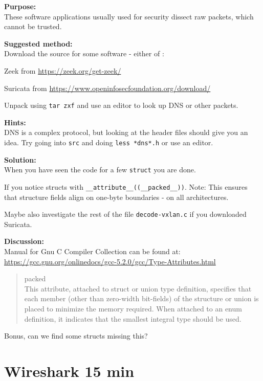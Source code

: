 \documentclass[a4paper,11pt,notitlepage]{report}
\begin{document}
{\bf Purpose:}\\
These software applications usually used for security dissect raw packets, which cannot be trusted.

{\bf Suggested method:}\\
Download the source for some software - either of :
\begin{list2}
\item Zeek from \url{https://zeek.org/get-zeek/}
\item Suricata from \url{https://www.openinfosecfoundation.org/download/}
\end{list2}

Unpack using \verb+tar zxf+ and use an editor to look up DNS or other packets.

{\bf Hints:}\\
DNS is a complex protocol, but looking at the header files should give you an idea. Try going into \verb+src+ and doing \verb+less *dns*.h+ or use an editor.


{\bf Solution:}\\
When you have seen the code for a few \verb+struct+ you are done.

If you notice structs with \verb+__attribute__((__packed__))+. Note: This ensures that structure fields align on one-byte boundaries - on all architectures.

Maybe also investigate the rest of the file \verb+decode-vxlan.c+ if you downloaded Suricata.

{\bf Discussion:}\\
Manual for Gnu C Compiler Collection can be found at:\\
\url{https://gcc.gnu.org/onlinedocs/gcc-5.2.0/gcc/Type-Attributes.html}


\begin{quote}
packed\\
This attribute, attached to struct or union type definition, specifies that each member (other than zero-width bit-fields) of the structure or union is placed to minimize the memory required. When attached to an enum definition, it indicates that the smallest integral type should be used.
\end{quote}

Bonus, can we find some structs missing this?



\chapter{Wireshark 15 min}
\label{ex:wireshark-install}
\end{document}
